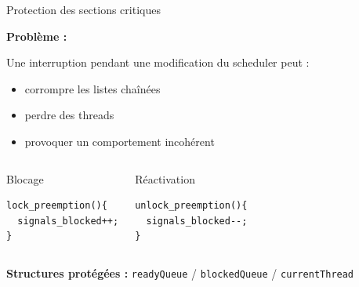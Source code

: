 \begin{frame}[fragile]{Protection des sections critiques}

\textbf{Problème :}

\vspace{0.2cm}

Une interruption pendant une modification du scheduler peut :
\begin{itemize}
    \item corrompre les listes chaînées
    \item perdre des threads
    \item provoquer un comportement incohérent
\end{itemize}

\begin{columns}


\begin{block}{\small Blocage}
\small
\begin{verbatim}
lock_preemption(){
  signals_blocked++;
}
\end{verbatim}
\end{block}


\begin{block}{\small Réactivation}
\small
\begin{verbatim}
unlock_preemption(){
  signals_blocked--;
}
\end{verbatim}
\end{block}

\end{columns}

\vspace{1cm}

\textbf{\small Structures protégées :} {\small \texttt{readyQueue} / \texttt{blockedQueue} / \texttt{currentThread}}

\end{frame}



